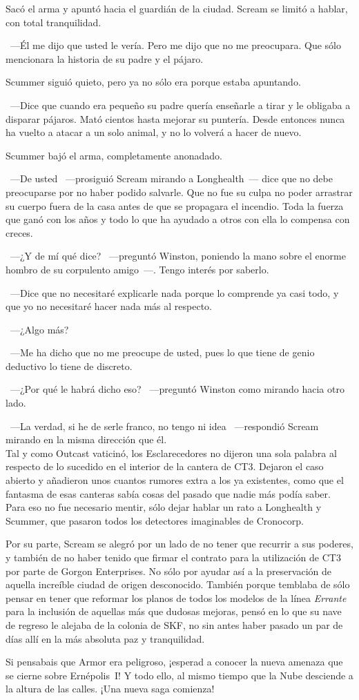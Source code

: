 Sacó el arma y apuntó hacia el guardián de la ciudad. Scream se limitó a hablar, con total tranquilidad.

~---Él me dijo que usted le vería. Pero me dijo que no me preocupara. Que sólo mencionara la historia de su padre y el pájaro.

Scummer siguió quieto, pero ya no sólo era porque estaba apuntando.

~---Dice que cuando era pequeño su padre quería enseñarle a tirar y le obligaba a disparar pájaros. Mató cientos hasta mejorar su puntería. Desde entonces nunca ha vuelto a atacar a un solo animal, y no lo volverá a hacer de nuevo.

Scummer bajó el arma, completamente anonadado.

~---De usted ~---prosiguió Scream mirando a Longhealth~--- dice que no debe preocuparse por no haber podido salvarle. Que no fue su culpa no poder arrastrar su cuerpo fuera de la casa antes de que se propagara el incendio. Toda la fuerza que ganó con los años y todo lo que ha ayudado a otros con ella lo compensa con creces.

~---¿Y de mí qué dice? ~---preguntó Winston, poniendo la mano sobre el enorme hombro de su corpulento amigo~---. Tengo interés por saberlo.

~---Dice que no necesitaré explicarle nada porque lo comprende ya casi todo, y que yo no necesitaré hacer nada más al respecto.

~---¿Algo más?

~---Me ha dicho que no me preocupe de usted, pues lo que tiene de genio deductivo lo tiene de discreto.

~---¿Por qué le habrá dicho eso? ~---preguntó Winston como mirando hacia otro lado.

~---La verdad, si he de serle franco, no tengo ni idea ~---respondió Scream mirando en la misma dirección que él.\\

\noindent{}Tal y como Outcast vaticinó, los Esclarecedores no dijeron una sola palabra al respecto de lo sucedido en el interior de la cantera de CT3. Dejaron el caso abierto y añadieron unos cuantos rumores extra a los ya existentes, como que el fantasma de esas canteras sabía cosas del pasado que nadie más podía saber. Para eso no fue necesario mentir, sólo dejar hablar un rato a Longhealth y Scummer, que pasaron todos los detectores imaginables de Cronocorp.

Por su parte, Scream se alegró por un lado de no tener que recurrir a sus poderes, y también de no haber tenido que firmar el contrato para la utilización de CT3 por parte de Gorgon Enterprises. No sólo por ayudar así a la preservación de aquella increíble ciudad de origen desconocido. También porque temblaba de sólo pensar en tener que reformar los planos de todos los modelos de la línea \emph{Errante} para la inclusión de aquellas más que dudosas mejoras, pensó en lo que su nave de regreso le alejaba de la colonia de SKF, no sin antes haber pasado un par de días allí en la más absoluta paz y tranquilidad.

\begin{next}
    Si pensabais que Armor era peligroso, ¡esperad a conocer la nueva amenaza que se cierne sobre Ernépolis~I! Y todo ello, al mismo tiempo que la Nube desciende a la altura de las calles. ¡Una nueva saga comienza!
\end{next}

\endinput
